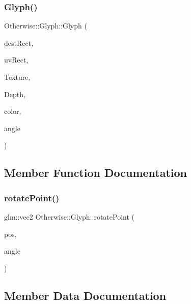 \mbox{\label{class_otherwise_1_1_glyph_a510e44844c26d0617588c715c240b1d0}} 
\subsubsection{\texorpdfstring{Glyph()}{Glyph()}\hspace{0.1cm}{\footnotesize\ttfamily [3/3]}}
{\footnotesize\ttfamily Otherwise\+::\+Glyph\+::\+Glyph (\begin{DoxyParamCaption}\item[{const glm\+::vec4 \&}]{dest\+Rect,  }\item[{const glm\+::vec4 \&}]{uv\+Rect,  }\item[{G\+Luint}]{Texture,  }\item[{float}]{Depth,  }\item[{const \hyperlink{struct_otherwise_1_1_color_r_g_b_a8}{Color\+R\+G\+B\+A8} \&}]{color,  }\item[{float}]{angle }\end{DoxyParamCaption})}



\subsection{Member Function Documentation}
\mbox{\label{class_otherwise_1_1_glyph_a1bfdcf1a8e9cbb1f2b86fb9f3d09160c}} 
\subsubsection{\texorpdfstring{rotate\+Point()}{rotatePoint()}}
{\footnotesize\ttfamily glm\+::vec2 Otherwise\+::\+Glyph\+::rotate\+Point (\begin{DoxyParamCaption}\item[{const glm\+::vec2 \&}]{pos,  }\item[{float}]{angle }\end{DoxyParamCaption})\hspace{0.3cm}{\ttfamily [private]}}



\subsection{Member Data Documentation}
\mbox{\label{class_otherwise_1_1_glyph_a32db963ff65bdbc764a322f729cc485f}} 
